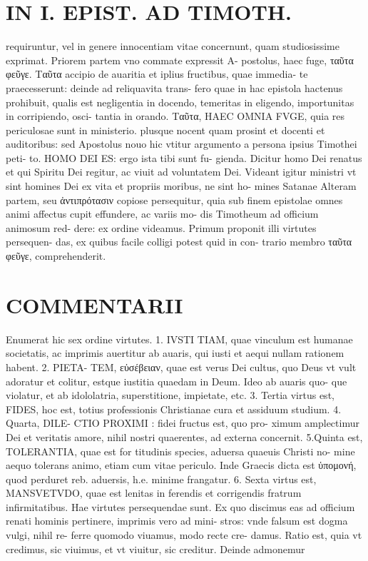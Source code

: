 \documentclass{article}
\begin{document}
\begin{pages}
\section*{IN I. EPIST. AD TIMOTH. }
\marginpar{[ p.159 ]}\pstart requiruntur, vel in genere innocentiam vitae concernunt, quam studiosissime exprimat. Priorem partem vno commate expressit A- postolus, haec fuge, ταῦτα φεῦγε. Ταῦτα accipio de auaritia et iplius fructibus, quae immedia- te praecesserunt: deinde ad reliquavita trans- fero quae in hac epistola hactenus prohibuit, qualis est negligentia in docendo, temeritas in eligendo, importunitas in corripiendo, osci- tantia in orando. Ταῦτα, HAEC OMNIA FVGE, quia res periculosae sunt in ministerio. plusque nocent quam prosint et docenti et auditoribus: sed Apostolus nouo hic vtitur argumento a persona ipsius Timothei peti- to. HOMO DEI ES: ergo ista tibi sunt fu- gienda. Dicitur homo Dei renatus et qui Spiritu Dei regitur, ac viuit ad voluntatem Dei.  \pend\pstart Videant igitur ministri vt sint homines Dei ex vita et propriis moribus, ne sint ho- mines Satanae  \pend\pstart Alteram partem, seu ἀντιπρότασιν copiose persequitur, quia sub finem epistolae omnes animi affectus cupit effundere, ac variis mo- dis Timotheum ad officium animosum red- dere: ex ordine videamus.  \pend\pstart Primum proponit illi virtutes persequen- das, ex quibus facile colligi potest quid in con- trario membro ταῦτα φεῦγε, comprehenderit.  \pend
\section*{COMMENTARII }
\marginpar{[ p.160 ]}\pstart Enumerat hic sex ordine virtutes. 1. IVSTI TIAM, quae vinculum est humanae societatis, ac imprimis auertitur ab auaris, qui iusti et aequi nullam rationem habent. 2. PIETA- TEM, εὐσέβειαν, quae est verus Dei cultus, quo Deus vt vult adoratur et colitur, estque iustitia quaedam in Deum. Ideo ab auaris quo- que violatur, et ab idololatria, superstitione, impietate, etc. 3. Tertia virtus est, FIDES, hoc est, totius professionis Christianae cura et assiduum studium. 4. Quarta, DILE- CTIO PROXIMI : fidei fructus est, quo pro- ximum amplectimur Dei et veritatis amore, nihil nostri quaerentes, ad externa concernit. 5.Quinta est, TOLERANTIA, quae est for titudinis species, aduersa quaeuis Christi no- mine aequo tolerans animo, etiam cum vitae periculo. Inde Graecis dicta est ὑπομονή, quod perduret reb. aduersis, h.e. minime frangatur. 6. Sexta virtus est, MANSVETVDO, quae est lenitas in ferendis et corrigendis fratrum infirmitatibus. Hae virtutes persequendae sunt. Ex quo discimus eas ad officium renati hominis pertinere, imprimis vero ad mini- stros: vnde falsum est dogma vulgi, nihil re- ferre quomodo viuamus, modo recte cre- damus.  \pend\pstart Ratio est, quia vt credimus, sic viuimus, et vt viuitur, sic creditur. Deinde admonemur  \pend

\end{pages}
\end{document}
